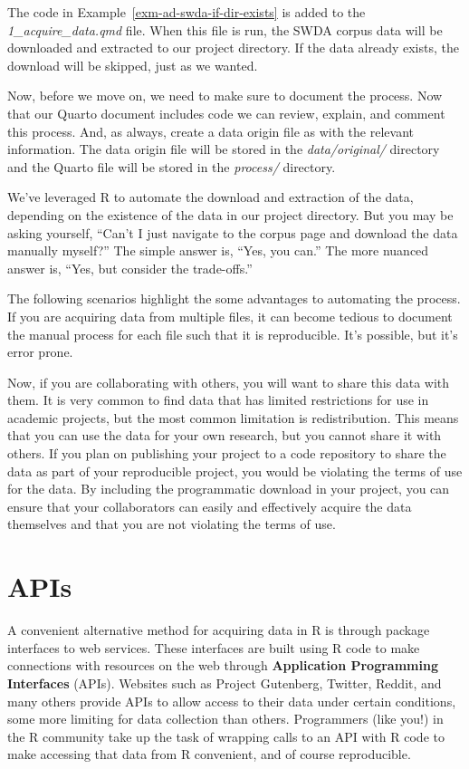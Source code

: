 \documentclass[
  letterpaper,
]{latex/krantz}
\theoremstyle{definition}
\theoremstyle{remark}
\begin{document}
The code in Example~\ref{exm-ad-swda-if-dir-exists} is added to the
\emph{1\_acquire\_data.qmd} file. When this file is run, the SWDA corpus
data will be downloaded and extracted to our project directory. If the
data already exists, the download will be skipped, just as we wanted.

Now, before we move on, we need to make sure to document the process.
Now that our Quarto document includes code we can review, explain, and
comment this process. And, as always, create a data origin file as with
the relevant information. The data origin file will be stored in the
\emph{data/original/} directory and the Quarto file will be stored in
the \emph{process/} directory.

We've leveraged R to automate the download and extraction of the data,
depending on the existence of the data in our project directory. But you
may be asking yourself, ``Can't I just navigate to the corpus page and
download the data manually myself?'' The simple answer is, ``Yes, you
can.'' The more nuanced answer is, ``Yes, but consider the trade-offs.''

The following scenarios highlight the some advantages to automating the
process. If you are acquiring data from multiple files, it can become
tedious to document the manual process for each file such that it is
reproducible. It's possible, but it's error prone.

Now, if you are collaborating with others, you will want to share this
data with them. It is very common to find data that has limited
restrictions for use in academic projects, but the most common
limitation is redistribution. This means that you can use the data for
your own research, but you cannot share it with others. If you plan on
publishing your project to a code repository to share the data as part
of your reproducible project, you would be violating the terms of use
for the data. By including the programmatic download in your project,
you can ensure that your collaborators can easily and effectively
acquire the data themselves and that you are not violating the terms of
use.

\section{APIs}\label{sec-apis}

A convenient alternative method for acquiring data in R is through
package interfaces to web services. These interfaces are built using R
code to make connections with resources on the web through
\textbf{Application Programming Interfaces} (APIs). Websites such as
Project Gutenberg, Twitter, Reddit, and many others provide APIs to
allow access to their data under certain conditions, some more limiting
for data collection than others. Programmers (like you!) in the R
community take up the task of wrapping calls to an API with R code to
make accessing that data from R convenient, and of course reproducible.
\end{document}
